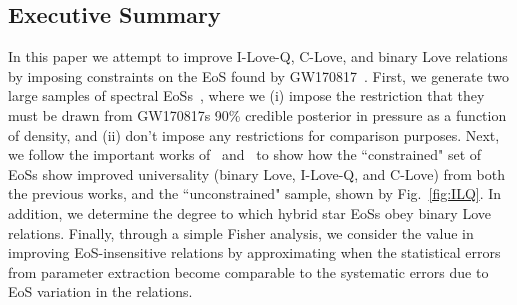 \documentclass[prd,twocolumn,nofootinbib,superscriptaddress,amsmath,amssymb]{revtex4-1}
\begin{document}
\subsection{Executive Summary}
In this paper we attempt to improve I-Love-Q, C-Love, and binary Love relations by imposing constraints on the EoS found by GW170817~\cite{LIGO:posterior,TheLIGOScientific:2017qsa}.
First, we generate two large samples of spectral EoSs~\cite{Lindblom:2018rfr}, where we (i) impose the restriction that they must be drawn from GW170817s 90\% credible posterior in pressure as a function of density, and (ii) don't impose any restrictions for comparison purposes.
Next, we follow the important works of~\cite{Yagi:binLove} and~\cite{Yagi:ILQ} to show how the ``constrained" set of EoSs show improved universality (binary Love, I-Love-Q, and C-Love) from both the previous works, and the ``unconstrained" sample, shown by Fig.~\ref{fig:ILQ}.
In addition, we determine the degree to which hybrid star EoSs obey binary Love relations.
Finally, through a simple Fisher analysis, we consider the value in improving EoS-insensitive relations by approximating when the statistical errors from parameter extraction become comparable to the systematic errors due to EoS variation in the relations.
\end{document}
